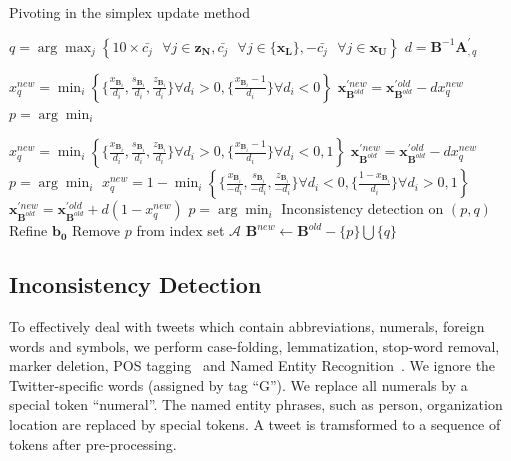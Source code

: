 \documentclass[envcountsame]{llncs}
\begin{document}
\begin{algorithm}[ht]\label{alg:pivoting}
\caption{Pivoting in the simplex update method}
    $q = \arg\max_{j} \left\{10\times\bar{c_j}\textrm{ } \forall j\in \mathbf{z_N}, \bar{c_j} \textrm{ } \forall j\in\{\mathbf{x_L}  \},-\bar{c_j}\textrm{ }  \forall j\in\mathbf{x_U}  \right\}$\;
    $d = \mathbf{B}^{-1}\mathbf{A}_{,q}^{'}$\;
    {
        $x_q^{new} = \min_i \left\{\{\frac{x_{\mathbf{B}_{i}}}{d_i}, \frac{s_{\mathbf{B}_{i}}}{d_i}, \frac{z_{\mathbf{B}_{i}}}{d_i}\} \forall d_i>0,\{\frac{x_{\mathbf{B}_{i}}-1}{d_i}\} \forall d_i<0\right\}$\;
        $\mathbf{x}_{\mathbf{B}^{old}}^{'new} = \mathbf{x}_{\mathbf{B}^{old}}^{'old} - dx_q^{new}$\;
        $p=\arg\min_{i}$\;

    }
    {
        $x_q^{new} = \min_i \left\{\{\frac{x_{\mathbf{B}_{i}}}{d_i}, \frac{s_{\mathbf{B}_{i}}}{d_i}, \frac{z_{\mathbf{B}_{i}}}{d_i}\} \forall d_i>0, \{\frac{x_{\mathbf{B}_{i}}-1}{d_i}\} \forall d_i<0, 1 \right\}$\;
        $\mathbf{x}_{\mathbf{B}^{old}}^{'new} = \mathbf{x}_{\mathbf{B}^{old}}^{'old} - dx_q^{new}$\; 
        {
            $p=\arg\min_{i}$\;
        }
    }
    {
        $x_q^{new} = 1 - \min_i \left\{\{\frac{x_{\mathbf{B}_{i}}}{-d_i}, \frac{s_{\mathbf{B}_{i}}}{-d_i}, \frac{z_{\mathbf{B}_{i}}}{-d_i}\} \forall d_i<0, \{\frac{1-x_{\mathbf{B}_{i}}}{d_i}\} \forall d_i>0, 1 \right\}$\;
        $\mathbf{x}_{\mathbf{B}^{old}}^{'new} = \mathbf{x}_{\mathbf{B}^{old}}^{'old} + d(1-x_q^{new})$\;
        {
            $p=\arg\min_{i}$\;
        }
    }
{
	Inconsistency detection on $(p,q)$\;
	{ Refine $\mathbf{b_0}$\;
	  Remove $p$ from index set $\mathcal{A}$\;
}	
}
 $\mathbf{B}^{new} \leftarrow \mathbf{B}^{old} - \{p\} \bigcup \{q\}$\;

\end{algorithm}

\subsection{Inconsistency Detection}


To effectively deal with tweets which contain abbreviations, numerals, foreign words and symbols, we perform case-folding, lemmatization, stop-word removal, marker deletion, POS tagging~\cite{Rudra2015Extracting} and Named Entity Recognition~\cite{Finkel2005Incorporating}. We ignore the Twitter-specific words (assigned by tag ``G''). We replace all numerals by a special token ``numeral''. The named entity phrases, such as person, organization location are  replaced by special tokens. A tweet is tramsformed to a sequence of tokens after pre-processing. 
\end{document}
